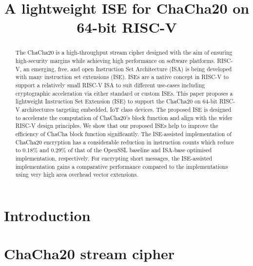 \documentclass[preprint]{iacrtrans}
\title{A lightweight ISE for ChaCha20 on 64-bit RISC-V}
\author{}
\institute{}
\begin{document}

\maketitle

\begin{abstract}
The ChaCha20 is a high-throughput stream cipher designed with the aim of ensuring high-security margins while achieving high performance on software platforms. RISC-V, an emerging, free, and open Instruction Set Architecture (ISA) is being developed with many instruction set extensions (ISE). ISEs are a native concept in RISC-V to support a relatively small RISC-V ISA to suit different use-cases including cryptographic acceleration via either standard or custom ISEs. This paper proposes a lightweight Instruction Set Extension (ISE) to support the ChaCha20 on 64-bit RISC-V architectures targeting embedded, IoT class devices. The proposed ISE is designed to accelerate the computation of ChaCha20's block function and align with the wider RISC-V design principles. We show that our proposed ISEs help to improve the efficiency of ChaCha block function significantly. The ISE-assisted implementation of ChaCha20 encryption has a considerable reduction in instruction counts which reduce to 0.18\% and 0.29\% of that of the OpenSSL baseline and ISA-base optimised implementation, respectively. For encrypting short messages, the ISE-assisted implementation gains a comparative performance compared to the implementations using very high area overhead vector extensions.
\end{abstract}



\section{Introduction}
\label{sec:intro}


\section{ChaCha20 stream cipher}
\label{sec:bg}

\end{document}
